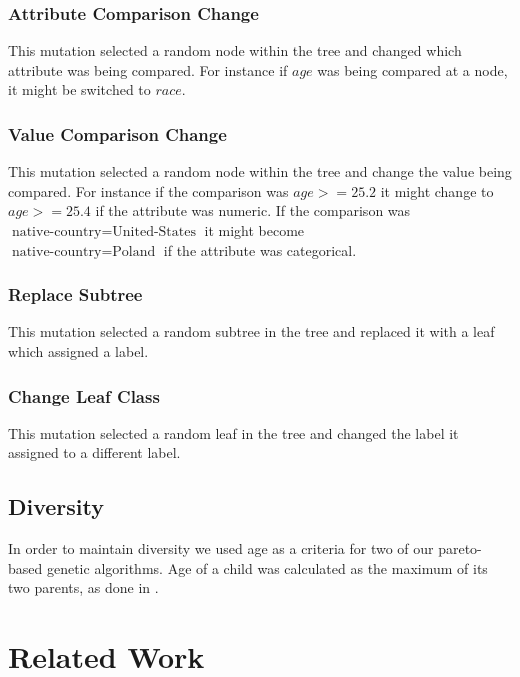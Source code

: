 \documentclass{acm_proc_article-sp}
\begin{document}
\subsubsection{Attribute Comparison Change}

This mutation selected a random node within the tree and changed which attribute was being compared. For instance if $age$ was being compared at a node, it might be switched to $race$.

\subsubsection{Value Comparison Change}

This mutation selected a random node within the tree and change the value being compared. For instance if the comparison was $age>=25.2$ it might change to $age>=25.4$ if the attribute was numeric. If the comparison was \\ $\text{native-country} = \text{United-States}$ it might become \\ $\text{native-country} = \text{Poland}$ if the attribute was categorical.

\subsubsection{Replace Subtree}

This mutation selected a random subtree in the tree and replaced it with a leaf which assigned a label.

\subsubsection{Change Leaf Class}

This mutation selected a random leaf in the tree and changed the label it assigned to a different label.

\subsection{Diversity}

In order to maintain diversity we used age as a criteria for two of our pareto-based genetic algorithms. Age of a child was calculated as the maximum of its two parents, as done in \cite{schmidt2011}.

\section{Related Work}
\end{document}
